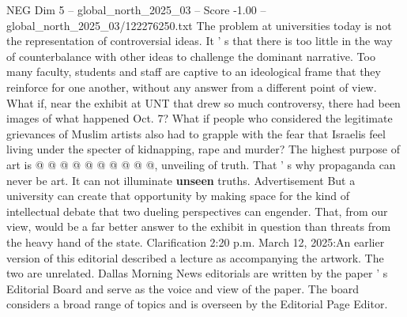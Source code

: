 \begin{textsample}{NEG Dim 5 – global\_north\_2025\_03 – Score -1.00 – global\_north\_2025\_03/122276250.txt}
The problem at universities today is not the representation of controversial ideas.
It ' s that there is too little in the way of counterbalance with other ideas to challenge the dominant narrative.
Too many faculty, students and staff are captive to an ideological frame that they reinforce for one another, without any answer from a different point of view.
What if, near the exhibit at UNT that drew so much controversy, there had been images of what happened Oct. 7?
What if people who considered the legitimate grievances of Muslim artists also had to grapple with the fear that Israelis feel living under the specter of kidnapping, rape and murder?
The highest purpose of art is @ @ @ @ @ @ @ @ @ @, unveiling of truth.
That ' s why propaganda can never be art.
It can not illuminate \textbf{unseen} truths.
Advertisement But a university can create that opportunity by making space for the kind of intellectual debate that two dueling perspectives can engender.
That, from our view, would be a far better answer to the exhibit in question than threats from the heavy hand of the state.
Clarification 2:20 p.m.
March 12, 2025:An earlier version of this editorial described a lecture as accompanying the artwork.
The two are unrelated.
Dallas Morning News editorials are written by the paper ' s Editorial Board and serve as the voice and view of the paper.
The board considers a broad range of topics and is overseen by the Editorial Page Editor.

\end{textsample}
